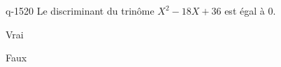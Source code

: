 \begin{truefalse}{q-1520}
Le discriminant du trinôme $X^2-18X+36$ est égal à $0$.
\item Vrai
\item* Faux
\end{truefalse}

